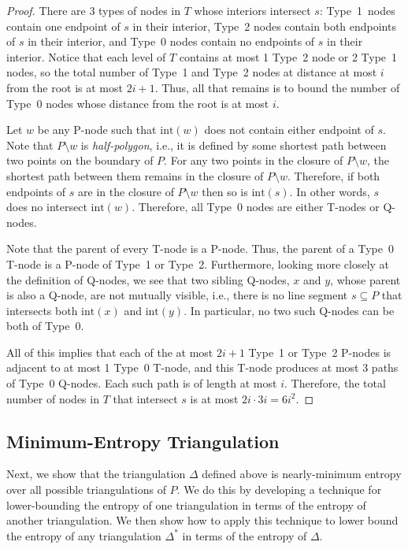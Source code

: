 \documentclass[acmtalg]{acmsmall}
\newcommand{\interior}{\mathrm{int}}
\begin{document}
\begin{proof}
There are 3 types of nodes in $T$ whose interiors intersect $s$:
Type~1~nodes contain one endpoint of $s$ in their interior, Type~2
nodes contain both endpoints of $s$ in their interior, and Type~0
nodes contain no endpoints of $s$ in their interior.  Notice that each
level of $T$ contains at most 1 Type~2 node or 2 Type~1 nodes, so the
total number of Type~1 and Type~2 nodes at distance at most $i$ from
the root is at most $2i+1$.  Thus, all
that remains is to bound the number of Type~0 nodes whose distance
from the root is at most $i$.

Let $w$ be any P-node such that $\interior(w)$ does not contain either
endpoint of $s$.  Note that $P\setminus w$ is \emph{half-polygon}, i.e.,
it is defined by some shortest path between two points on the boundary
of $P$.  For any two points in the closure of $P\setminus w$, the shortest
path between them remains in the closure of $P\setminus w$.  Therefore,
if both endpoints of $s$ are in the closure of $P\setminus w$ then so
is $\interior(s)$.  In other words, $s$ does no intersect $\interior(w)$.
Therefore, all Type~0 nodes are either T-nodes or Q-nodes.

Note that the parent of every T-node is a P-node.  Thus, the parent of a
Type~0 T-node is a P-node of Type~1 or Type~2.  Furthermore, looking more
closely at the definition of Q-nodes, we see that two sibling Q-nodes,
$x$ and $y$, whose parent is also a Q-node, are not mutually visible,
i.e., there is no line segment $s\subseteq P$ that intersects both
$\interior(x)$ and $\interior(y)$.  In particular, no two such Q-nodes
can be both of Type~0.

All of this implies that each of the at most $2i+1$ Type~1 or Type~2
P-nodes is adjacent to at most 1 Type~0 T-node, and this T-node produces
at most 3 paths of Type~0 Q-nodes. Each such path is of length at most
$i$.  Therefore, the total number of nodes in $T$ that intersect $s$
is at most  $2i\cdot 3i=6i^2$.
\end{proof}

\subsection{Minimum-Entropy Triangulation}

Next, we show that the triangulation $\Delta$ defined above is
nearly-minimum entropy over all possible triangulations of $P$.  We do
this by developing a technique for lower-bounding the entropy of one
triangulation in terms of the entropy of another triangulation.  We
then show how to apply this technique to lower bound the entropy of
any triangulation $\Delta^*$ in terms of the entropy of $\Delta$.
  
\end{document}
